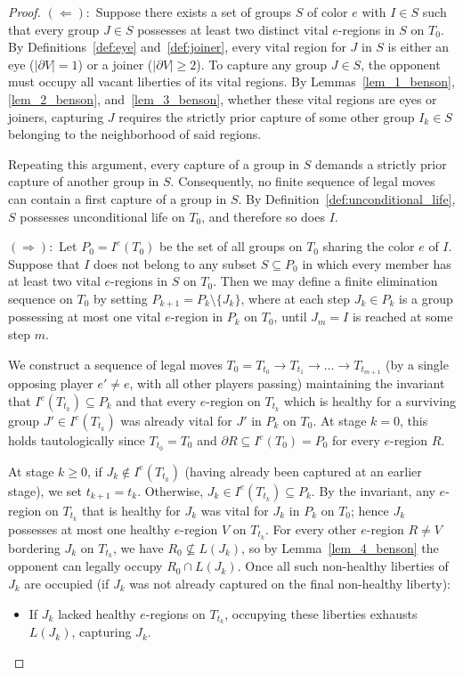 \begin{proof}
	$(\Leftarrow):$ Suppose there exists a set of groups $S$ of color $e$ with $I \in S$ such that every group $J \in S$ possesses at least two distinct vital $e$-regions in $S$ on $T_0$. By Definitions~\ref{def:eye} and~\ref{def:joiner}, every vital region for $J$ in $S$ is either an eye ($|\partial V| = 1$) or a joiner ($|\partial V| \ge 2$). To capture any group $J \in S$, the opponent must occupy all vacant liberties of its vital regions. By Lemmas~\ref{lem_1_benson}, \ref{lem_2_benson}, and~\ref{lem_3_benson}, whether these vital regions are eyes or joiners, capturing $J$ requires the strictly prior capture of some other group $I_k \in S$ belonging to the neighborhood of said regions.
	
	Repeating this argument, every capture of a group in $S$ demands a strictly prior capture of another group in $S$. Consequently, no finite sequence of legal moves can contain a first capture of a group in $S$. By Definition~\ref{def:unconditional_life}, $S$ possesses unconditional life on $T_0$, and therefore so does $I$.
	
	$(\Rightarrow):$ Let $P_0 = I^e(T_0)$ be the set of all groups on $T_0$ sharing the color $e$ of $I$. Suppose that $I$ does not belong to any subset $S \subseteq P_0$ in which every member has at least two vital $e$-regions in $S$ on $T_0$. Then we may define a finite elimination sequence on $T_0$ by setting $P_{k+1} = P_k \setminus \{J_k\}$, where at each step $J_k \in P_k$ is a group possessing at most one vital $e$-region in $P_k$ on $T_0$, until $J_m = I$ is reached at some step $m$.
	
	We construct a sequence of legal moves $T_0 = T_{t_0} \to T_{t_1} \to \dots \to T_{t_{m+1}}$ (by a single opposing player $e' \neq e$, with all other players passing) maintaining the invariant that $I^e(T_{t_k}) \subseteq P_k$ and that every $e$-region on $T_{t_k}$ which is healthy for a surviving group $J' \in I^e(T_{t_k})$ was already vital for $J'$ in $P_k$ on $T_0$. At stage $k = 0$, this holds tautologically since $T_{t_0} = T_0$ and $\partial R \subseteq I^e(T_0) = P_0$ for every $e$-region $R$.
	
	At stage $k \ge 0$, if $J_k \notin I^e(T_{t_k})$ (having already been captured at an earlier stage), we set $t_{k+1} = t_k$. Otherwise, $J_k \in I^e(T_{t_k}) \subseteq P_k$. By the invariant, any $e$-region on $T_{t_k}$ that is healthy for $J_k$ was vital for $J_k$ in $P_k$ on $T_0$; hence $J_k$ possesses at most one healthy $e$-region $V$ on $T_{t_k}$. For every other $e$-region $R \neq V$ bordering $J_k$ on $T_{t_k}$, we have $R_0 \not\subseteq L(J_k)$, so by Lemma~\ref{lem_4_benson} the opponent can legally occupy $R_0 \cap L(J_k)$. Once all such non-healthy liberties of $J_k$ are occupied (if $J_k$ was not already captured on the final non-healthy liberty):
	\begin{itemize}
		\item If $J_k$ lacked healthy $e$-regions on $T_{t_k}$, occupying these liberties exhausts $L(J_k)$, capturing $J_k$.
		

\end{itemize}
\end{proof}
